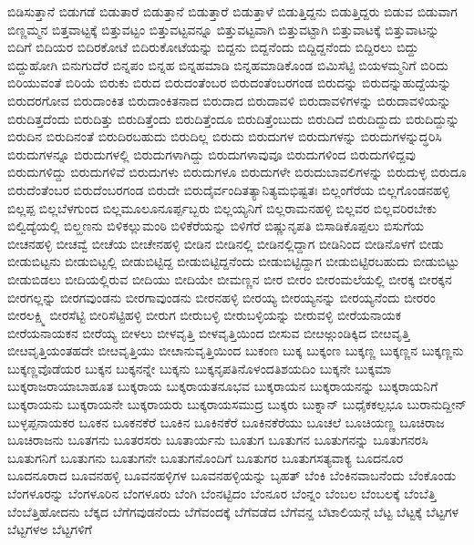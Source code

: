 {ಬಿಡಿಸುತ್ತಾನೆ
ಬಿಡುಗಡೆ
ಬಿಡುತಾರೆ
ಬಿಡುತ್ತಾನೆ
ಬಿಡುತ್ತಾರೆ
ಬಿಡುತ್ತಾಳೆ
ಬಿಡುತ್ತಿದ್ದನು
ಬಿಡುತ್ತಿದ್ದರು
ಬಿಡುವ
ಬಿಡುವಾಗ
ಬಿಣ್ಣಮ್ಮನ
ಬಿತ್ತವಾಟ್ಟಕ್ಕೆ
ಬಿತ್ತುವಟ್ಟಂ
ಬಿತ್ತುವಟ್ಟವನ್ನೂ
ಬಿತ್ತುವಟ್ಟವಾಗಿ
ಬಿತ್ತುವಟ್ಟಾಗಿ
ಬಿತ್ತುವಾಟಕ್ಕೆ
ಬಿತ್ತುವಾಟನ್ನು
ಬಿದಿಗೆ
ಬಿದಿಯರ
ಬಿದಿರಕೋಟೆ
ಬಿದಿರುಕೋಟೆಯನ್ನು
ಬಿದ್ದನು
ಬಿದ್ದನೆಂದು
ಬಿದ್ದಿದ್ದನೆಂದು
ಬಿದ್ದಿರಲು
ಬಿದ್ದು
ಬಿದ್ದುಹೋಗಿ
ಬಿನುಗುದೆರೆ
ಬಿನ್ನಪಂ
ಬಿನ್ನಹ
ಬಿನ್ನಹಮಾಡಿ
ಬಿನ್ನಹಮಾಡಿಕೊಂಡ
ಬಿಮಿಸೆಟ್ಟಿ
ಬಿಯಳಮ್ಮನಿಗೆ
ಬಿರಿದು
ಬಿರಿಯುವಂತೆ
ಬಿರಿಯೆ
ಬಿರುಕು
ಬಿರುದ
ಬಿರುದಂತೆಂಬರ
ಬಿರುದಂತೆಂಬರಗಂಡ
ಬಿರುದನ್ನು
ಬಿರುದನ್ನುಹುದ್ದೆಯನ್ನು
ಬಿರುದರಗೋವ
ಬಿರುದಾಂಕಿತ
ಬಿರುದಾಂಕಿತನಾದ
ಬಿರುದಾದ
ಬಿರುದಾವಳಿ
ಬಿರುದಾವಳಿಗಳನ್ನು
ಬಿರುದಾವಳಿಯನ್ನು
ಬಿರುದಿತ್ತದೆಂದು
ಬಿರುದಿತ್ತು
ಬಿರುದಿತ್ತೆಂದು
ಬಿರುದಿತ್ತೆಂದೂ
ಬಿರುದಿತ್ತೆಂಬುದು
ಬಿರುದಿದೆ
ಬಿರುದಿದ್ದುದು
ಬಿರುದಿದ್ದುನ್ನು
ಬಿರುದಿನ
ಬಿರುದಿನಂತೆ
ಬಿರುದಿರಬಹುದು
ಬಿರುದಿಲ್ಲ
ಬಿರುದು
ಬಿರುದುಗಳ
ಬಿರುದುಗಳನ್ನು
ಬಿರುದುಗಳನ್ನುದ್ಧರಿಸಿ
ಬಿರುದುಗಳನ್ನೂ
ಬಿರುದುಗಳಲ್ಲಿ
ಬಿರುದುಗಳಾಗಿದ್ದು
ಬಿರುದುಗಳಾವುವೂ
ಬಿರುದುಗಳಿಂದ
ಬಿರುದುಗಳಿದ್ದವು
ಬಿರುದುಗಳಿದ್ದು
ಬಿರುದುಗಳಿವೆ
ಬಿರುದುಗಳು
ಬಿರುದುಗಳೂ
ಬಿರುದುಗಳೇ
ಬಿರುದುಬಾವಲಿಗಳನ್ನು
ಬಿರುದುಳ್ಳ
ಬಿರುದೂ
ಬಿರುದೆಂತೆಂಬರ
ಬಿರುದೆಂಬರಗಂಡ
ಬಿರುದೇ
ಬಿರುದೈರ್ವಂದಿತತ್ಯಾನಿತ್ಯಮಭಿಷ್ಟತಃ
ಬಿಲ್ಲಂಗೆರೆಯ
ಬಿಲ್ಲಗೊಂಡನಹಳ್ಳಿ
ಬಿಲ್ಲಪ್ಪ
ಬಿಲ್ಲಬೆಳಗುಂದ
ಬಿಲ್ಲಮೂಲೂನೂರ್ಪ್ಪಬ್ಬರು
ಬಿಲ್ಲಯ್ಯನಿಗೆ
ಬಿಲ್ಲರಾಮನಹಳ್ಳಿ
ಬಿಲ್ಲವರ
ಬಿಲ್ಲವರಿರಬೇಕು
ಬಿಲ್ವಿದ್ಯೆಯಲ್ಲಿ
ಬಿಲ್ಹಣನು
ಬಿಳಿಕಲ್ಲುಮಂಠಿ
ಬಿಳಿಕೆರೆಯನ್ನು
ಬಿಳಿಗೆರೆ
ಬಿಷ್ಣುನೃಪತಿ
ಬಿಸಾಡಿಕೊಪ್ಪಲು
ಬಿಸುಗೆಯ
ಬೀಚನಹಳ್ಳಿ
ಬೀಚವ್ವೆ
ಬೀಚೆಯ
ಬೀಚೇನಹಳ್ಳಿ
ಬೀಡಿನ
ಬೀಡಿನಲ್ಲಿ
ಬೀಡಿನಲ್ಲಿದ್ದಾಗ
ಬೀಡಿನಿಂದ
ಬೀಡಿನೊಳಗೆ
ಬೀಡು
ಬೀಡುಬಿಟ್ಟನು
ಬೀಡುಬಿಟ್ಟಲ್ಲಿ
ಬೀಡುಬಿಟ್ಟಿದ್ದ
ಬೀಡುಬಿಟ್ಟಿದ್ದನೆಂದು
ಬೀಡುಬಿಟ್ಟಿದ್ದಾಗ
ಬೀಡುಬಿಟ್ಟಿರಬಹುದು
ಬೀಡುಬಿಟ್ಟು
ಬೀಡುಬಿಡಲು
ಬೀದಿಯಲ್ಲಿರುವ
ಬೀದಿಯು
ಬೀದಿಯೇ
ಬೀಮಣ್ಣನ
ಬೀರ
ಬೀರಂ
ಬೀರಂಮಲೆಯಲ್ಲಿ
ಬೀರಕ್ಕ
ಬೀರಕ್ಕನ
ಬೀರಗಲ್ಲನ್ನು
ಬೀರಗವುಂಡನು
ಬೀರಗಾವುಂಡನು
ಬೀರನಹಳ್ಳಿ
ಬೀರಯ್ಯ
ಬೀರಯ್ಯನನ್ನು
ಬೀರಯ್ಯನೆಂದು
ಬೀರರಂ
ಬೀರಲಕ್ಷ್ಮಿ
ಬೀರಸೆಟ್ಟಿ
ಬೀರಿಸೆಟ್ಟಿಹಳ್ಳಿ
ಬೀರುಗ
ಬೀರುಬಳ್ಳಿ
ಬೀರುಬಳ್ಳಿಯನ್ನು
ಬೀರುವಳ್ಳಿ
ಬೀರೆಯನಾಯಕ
ಬೀರೆಯನಾಯಕನ
ಬೀರೆಯ್ಯ
ಬೀಳಲು
ಬೀಳವೃತ್ತಿ
ಬೀಳವೃತ್ತಿಯಿಂದ
ಬೀಸುವ
ಬೀೞಅ್ಗುಂಡಿಕ್ಕಿದ
ಬೀೞವೃತ್ತಿ
ಬೀೞವೃತ್ತಿಯಂತಹದೇ
ಬೀೞವೃತ್ತಿಯು
ಬೀೞಾನುವೃತ್ತಿಯಿಂದ
ಬುಕಂಣ
ಬುಕ್ಕ
ಬುಕ್ಕಂಣ
ಬುಕ್ಕಣ್ಣ
ಬುಕ್ಕಣ್ಣನ
ಬುಕ್ಕಣ್ಣನು
ಬುಕ್ಕಣ್ಣವೊಡೆಯರ
ಬುಕ್ಕನ
ಬುಕ್ಕನನ್ನೇ
ಬುಕ್ಕನು
ಬುಕ್ಕನೃಪತಿನೊಳಂದತಿಶಯದಿಂ
ಬುಕ್ಕನೇ
ಬುಕ್ಕಮಾ
ಬುಕ್ಕರಾಜರಾಯಾಬಾಹೂತ
ಬುಕ್ಕರಾಯ
ಬುಕ್ಕರಾಯತನೂಭವ
ಬುಕ್ಕರಾಯನ
ಬುಕ್ಕರಾಯನನ್ನು
ಬುಕ್ಕರಾಯನಿಗೆ
ಬುಕ್ಕರಾಯನು
ಬುಕ್ಕರಾಯನೇ
ಬುಕ್ಕರಾಯರು
ಬುಕ್ಕರಾಯಸಮುದ್ರ
ಬುಕ್ಕರು
ಬುಕ್ನಾನ್
ಬುಧೈಕಕಲ್ಪಭೂ
ಬುರಾನುದ್ದೀನ್
ಬುಳ್ಳಪ್ಪನಾಯಕರ
ಬೂಕನ
ಬೂಕನಕೆರೆ
ಬೂಕಿನ
ಬೂಕಿನಕೆರೆ
ಬೂಕಿನಕೆರೆಯು
ಬೂಚಲೆ
ಬೂಚಿಯಣ್ಣ
ಬೂಚಿರಾಜ
ಬೂಚಿರಾಜನು
ಬೂತಗನು
ಬೂತರಸರು
ಬೂತಾರ್ಯನು
ಬೂತುಗ
ಬೂತುಗನ
ಬೂತುಗನನ್ನು
ಬೂತುಗನರಸಿ
ಬೂತುಗನಿಗೆ
ಬೂತುಗನು
ಬೂತುಗನೇ
ಬೂತುಗನೊಂದಿಗೆ
ಬೂತುಗರ
ಬೂತುಗಸತ್ಯವಾಕ್ಯ
ಬೂದನೂರ
ಬೂದನೂರಾದ
ಬೂವನಹಳ್ಳಿ
ಬೂವನಹಳ್ಳಿಗಳ
ಬೂವನಹಳ್ಳಿಯನ್ನು
ಬೃಹತ್
ಬೆಂಕಿ
ಬೆಂಕಿನವಾಬನೆಂದು
ಬೆಂಕೊಂಡು
ಬೆಂಗಳೂರನ್ನು
ಬೆಂಗಳೂರಿನ
ಬೆಂಗಳೂರು
ಬೆಂಗಿ
ಬೆಂನಟ್ಟಿದಂ
ಬೆಂನೂರ
ಬೆಂನ್ನಂ
ಬೆಂಬಲ
ಬೆಂಬಲಕ್ಕೆ
ಬೆಂಬೆತ್ತಿ
ಬೆಂಬೆತ್ತಿಹೋದನು
ಬೆಕ್ಕದ
ಬೆಗೆಗವುಡನೆಂದು
ಬೆಗೆವಂದಕ್ಕೆ
ಬೆಗೆವಡೆದ
ಬೆಗೆವನ್ದ
ಬೆಟಾಲಿಯನ್ಗೆ
ಬೆಟ್ಟ
ಬೆಟ್ಟಕ್ಕೆ
ಬೆಟ್ಟಗಳ
ಬೆಟ್ಟಗಳಅ
ಬೆಟ್ಟಗಳಿಗೆ
}
